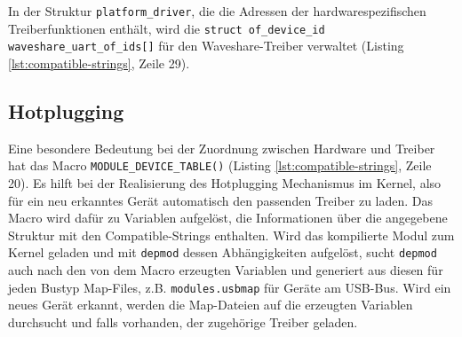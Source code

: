 In der Struktur \texttt{platform\_driver}, die die Adressen der hardwarespezifischen Treiberfunktionen enthält, wird die \texttt{struct of_device_id waveshare_uart_of_ids[]} für den Waveshare-Treiber verwaltet (Listing \ref{lst:compatible-strings}, Zeile 29).




\subsection{Hotplugging} %
Eine besondere Bedeutung bei der Zuordnung zwischen Hardware und Treiber hat das Macro \texttt{MODULE_DEVICE_TABLE()} (Listing \ref{lst:compatible-strings}, Zeile 20). Es hilft bei der Realisierung des Hotplugging Mechanismus im Kernel, also für ein neu erkanntes Gerät automatisch den passenden Treiber zu laden. Das Macro wird dafür zu Variablen aufgelöst, die Informationen über die angegebene Struktur mit den Compatible-Strings enthalten. Wird das kompilierte Modul zum Kernel geladen und mit \texttt{depmod} dessen Abhängigkeiten aufgelöst, sucht \texttt{depmod} auch nach den von dem Macro erzeugten Variablen und generiert aus diesen für jeden Bustyp Map-Files, z.B. \texttt{modules.usbmap} für Geräte am USB-Bus. Wird ein neues Gerät erkannt, werden die Map-Dateien auf die erzeugten Variablen durchsucht und falls vorhanden, der zugehörige Treiber geladen. \\

